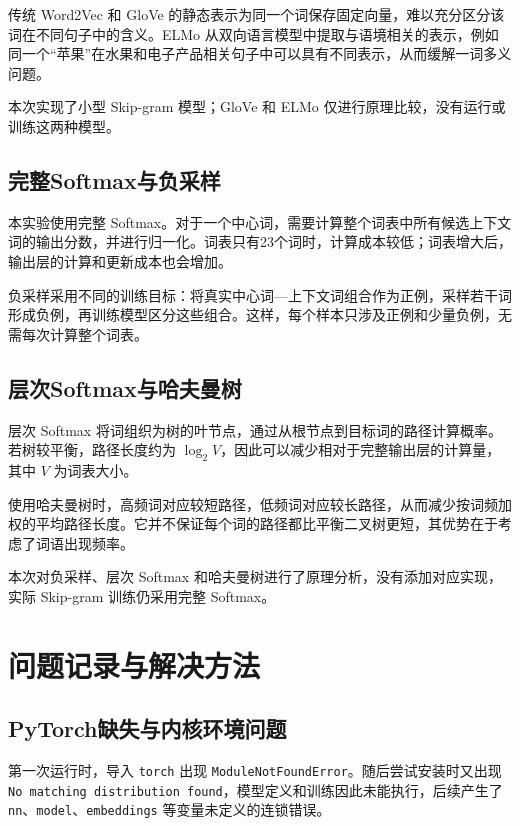 \documentclass[UTF8,a4paper,zihao=-4,fontset=none]{ctexart}
\begin{document}
传统 Word2Vec 和 GloVe 的静态表示为同一个词保存固定向量，难以充分区分该词在不同句子中的含义。ELMo 从双向语言模型中提取与语境相关的表示，例如同一个“苹果”在水果和电子产品相关句子中可以具有不同表示，从而缓解一词多义问题\cite{elmo}。

本次实现了小型 Skip-gram 模型；GloVe 和 ELMo 仅进行原理比较，没有运行或训练这两种模型。

\subsection{完整Softmax与负采样}

本实验使用完整 Softmax。对于一个中心词，需要计算整个词表中所有候选上下文词的输出分数，并进行归一化。词表只有23个词时，计算成本较低；词表增大后，输出层的计算和更新成本也会增加。

负采样采用不同的训练目标：将真实中心词—上下文词组合作为正例，采样若干词形成负例，再训练模型区分这些组合。这样，每个样本只涉及正例和少量负例，无需每次计算整个词表\cite{negative}。

\subsection{层次Softmax与哈夫曼树}

层次 Softmax 将词组织为树的叶节点，通过从根节点到目标词的路径计算概率。若树较平衡，路径长度约为 $\log_2V$，因此可以减少相对于完整输出层的计算量，其中 $V$ 为词表大小。

使用哈夫曼树时，高频词对应较短路径，低频词对应较长路径，从而减少按词频加权的平均路径长度。它并不保证每个词的路径都比平衡二叉树更短，其优势在于考虑了词语出现频率\cite{negative}。

本次对负采样、层次 Softmax 和哈夫曼树进行了原理分析，没有添加对应实现，实际 Skip-gram 训练仍采用完整 Softmax。

\section{问题记录与解决方法}

\subsection{PyTorch缺失与内核环境问题}

第一次运行时，导入 \texttt{torch} 出现 \texttt{ModuleNotFoundError}。随后尝试安装时又出现 \texttt{No matching distribution found}，模型定义和训练因此未能执行，后续产生了 \texttt{nn}、\texttt{model}、\texttt{embeddings} 等变量未定义的连锁错误。
\end{document}
